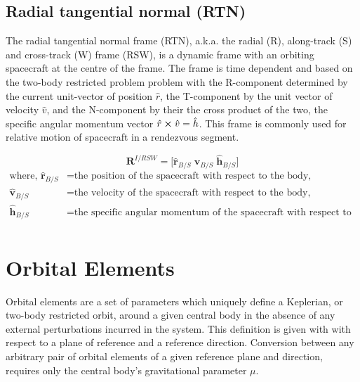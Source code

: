\subsection{Radial tangential normal (RTN)\label{ssec:frame_rtn}\label{ssec:frame_rsw}}

The radial tangential normal frame (RTN), a.k.a. the radial (R), along-track (S)
and cross-track (W) frame (RSW), is a dynamic frame with an orbiting spacecraft
at the centre of the frame. The frame is time dependent and based on the
two-body restricted problem problem with the R-component determined by the
current unit-vector of position $\hat{r}$, the T-component by the unit vector of
velocity $\hat{v}$, and the N-component by their the cross product of the two,
the specific angular momentum vector $\hat{r}\cross{\hat{v}}=\hat{h}$. This
frame is commonly used for relative motion of spacecraft in a rendezvous
segment.

\begin{equation}
    \mathbf{R}^{I/RSW}= \bigg[\hat{\mathbf{r}}_{B/S}\; \hat{\mathbf{v}}_{B/S}\; \hat{\mathbf{h}}_{B/S} \bigg]
\end{equation}
\begin{equation*}
    \begin{aligned}
        \textrm{where, }
        \hat{\mathbf{r}}_{B/S} &= \textrm{the position of the spacecraft with respect to the body,}\\
        \hat{\mathbf{v}}_{B/S} &= \textrm{the velocity of the spacecraft with respect to the body,}\\
        \hat{\mathbf{h}}_{B/S} &= \textrm{the specific angular momentum of the spacecraft with respect to the body,}\\
    \end{aligned}
\end{equation*}

\section{Orbital Elements}
Orbital elements are a set of parameters which uniquely define a Keplerian, or
two-body restricted orbit, around a given central body in the absence of any
external perturbations incurred in the system. This definition is given with
with respect to a plane of reference and a reference direction. Conversion
between any arbitrary pair of orbital elements of a given reference plane and
direction, requires only the central body's gravitational parameter $\mu$.


